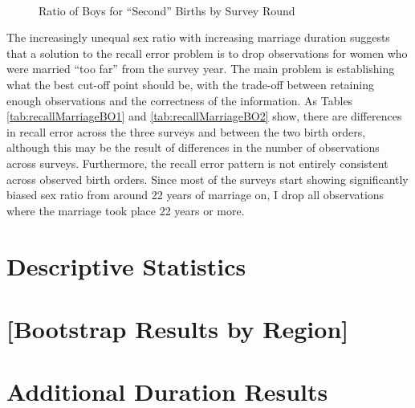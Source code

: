 \documentclass[12pt,letterpaper]{article}
\begin{document}
\begin{figure}
\centering
{}
 \\
\caption{Ratio of Boys for ``Second'' Births by Survey Round}
\label{fig:sex_ratio_recall_rounds_bo2}
\end{figure}


The increasingly unequal sex ratio with increasing marriage duration suggests that
a solution to the recall error problem is to drop observations for 
women who were married ``too far'' from the survey year.
The main problem is establishing what the best cut-off point should be, with the
trade-off between retaining enough observations and the correctness of the information.
As Tables \ref{tab:recallMarriageBO1} and \ref{tab:recallMarriageBO2} show, there are 
differences in recall error across the three surveys and between the two birth
orders, although this may be the result of differences in the number of observations 
across surveys.
Furthermore, the recall error pattern is not entirely consistent across observed birth 
orders.
Since most of the surveys start showing significantly biased sex ratio from around 22
years of marriage on, I drop all observations where the marriage took place 22 years
or more.


\clearpage
\newpage

\section{Descriptive Statistics}
\setcounter{figure}{0}
\setcounter{table}{0}




\clearpage
\newpage

\section{[Bootstrap Results by Region]}

\clearpage
\newpage


\section{Additional Duration Results}
\end{document}
